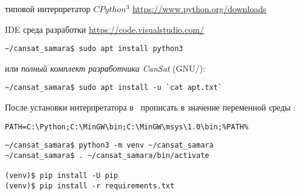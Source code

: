 \label{pyinst}\secdown

\begin{description}
    \item{типовой интерпретатор $CPython^3$} \url{https://www.python.org/downloads}
    \item{IDE среда разработки} \url{https://code.visualstudio.com/}
\end{description}

\begin{verbatim}
~/cansat_samara$ sudo apt install python3
\end{verbatim}
или \emph{полный комплект разработчика CanSat} (GNU/\linux):
\begin{verbatim}
~/cansat_samara$ sudo apt install -u `cat apt.txt`
\end{verbatim}

\noindent
После установки интерпретатора в \win\ прописать в 
значение переменной среды :
\begin{verbatim}
PATH=C:\Python;C:\MinGW\bin;C:\MinGW\msys\1.0\bin;%PATH%
\end{verbatim}


\begin{verbatim}
~/cansat_samara$ python3 -m venv ~/cansat_samara
~/cansat_samara$ . ~/cansat_samara/bin/activate

(venv)$ pip install -U pip
(venv)$ pip install -r requirements.txt
\end{verbatim}
    
\secup

